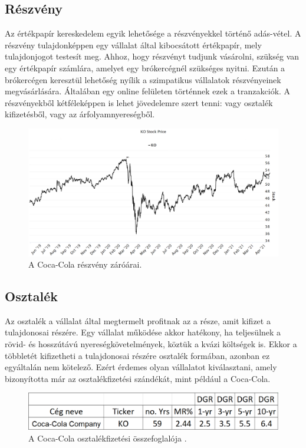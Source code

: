 \subsection{Részvény}
Az értékpapír kereskedelem egyik lehetősége a részvényekkel történő adás-vétel. A részvény tulajdonképpen egy vállalat által kibocsátott értékpapír, mely tulajdonjogot testesít meg. Ahhoz, hogy részvényt tudjunk vásárolni, szükség van egy értékpapír számlára, amelyet egy brókercégnél szükséges nyitni. Ezután a brókercégen keresztül lehetőség nyílik a szimpatikus vállalatok részvényeinek megvásárlására. Általában egy online felületen történnek ezek a tranzakciók. A részvényekből kétféleképpen is lehet jövedelemre szert tenni: vagy osztalék kifizetésből, vagy az árfolyamnyereségből.
\begin{figure}[ht]
\centering
\includegraphics[scale=0.22]{images/KO_stock.png}
\caption{A Coca-Cola részvény záróárai.}
\label{fig:PM}
\end{figure}

\subsection{Osztalék}
Az osztalék a vállalat által megtermelt profitnak az a része, amit kifizet a tulajdonosai részére. Egy vállalat működése akkor hatékony, ha teljesülnek a rövid- és hosszútávú nyereségkövetelmények, köztük a kvázi költségek is. Ekkor a többletét kifizetheti a tulajdonosai részére osztalék formában, azonban ez egyáltalán nem kötelező. Ezért érdemes olyan vállalatot kiválasztani, amely bizonyította már az osztalékfizetési szándékát, mint például a Coca-Cola.
\begin{figure}[ht]
\centering
\includegraphics[scale=0.22]{images/coca.png}
\caption{A Coca-Cola osztalékfizetési összefoglalója \cite{dripinvesting}.}
\label{fig:coca}
\end{figure}

